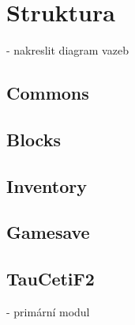 
\section{Struktura}

- nakreslit diagram vazeb

\subsection{Commons}


\subsection {Blocks}

\subsection{Inventory}

\subsection{Gamesave}

\subsection{TauCetiF2}

- primární modul


